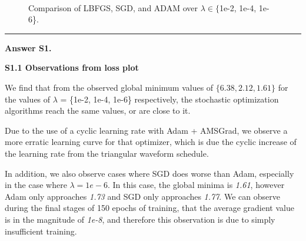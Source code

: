\documentclass[11pt]{report}
\begin{document}
\begin{figure}[t]
\centering
{}
~~
~~
\caption{Comparison of LBFGS, SGD, and ADAM over $\lambda \in \{${\sf 1e-2, 1e-4, 1e-6}\}.}
\label{fig:compare_sgd}
\end{figure}

\rule{\paperwidth}{0.6pt}
{\bf Answer S1.}
%

{\bf S1.1 Observations from loss plot}

We find that from the observed global minimum values of $\{6.38, 2.12, 1.61\}$ for the values of $\lambda$ = \{1e{-2}, 1e{-4}, 1e{-6}\} respectively, the stochastic optimization algorithms reach the same values, or are close to it.

Due to the use of a cyclic learning rate with Adam + AMSGrad, we observe a more erratic learning curve for that optimizer, which is due the cyclic increase of the learning rate from the triangular waveform schedule. 

In addition, we also observe cases where SGD does worse than Adam, especially in the case where $\lambda = 1e-6$. In this case, the global minima is \textit{1.61}, however Adam only approaches \textit{1.73} and SGD only approaches \textit{1.77}. We can observe during the final stages of 150 epochs of training, that the average gradient value is in the magnitude of \textit{1e-8}, and therefore this observation is due to simply insufficient training.
\end{document}
